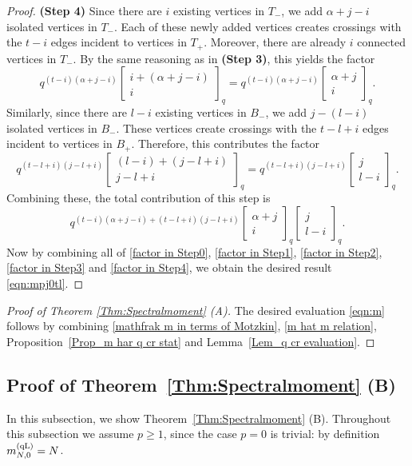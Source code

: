 \documentclass{amsart}
\newcommand{\qbinom}[2]{{\begin{bmatrix}#1\\#2\end{bmatrix}}_q}
\theoremstyle{plain}
\theoremstyle{remark}
\numberwithin{equation}{section}
\begin{document}
\begin{proof}
\noindent \textbf{(Step 4)}  
Since there are $i$ existing vertices in $T_-$, we add $\alpha+j-i$ isolated vertices in $T_-$. Each of these newly added vertices creates crossings with the $t-i$ edges incident to vertices in $T_+$.
Moreover, there are already $i$ connected vertices in $T_-$.
By the same reasoning as in \textbf{(Step 3)}, this yields the factor
        \begin{equation*}
            q^{(t-i)(\alpha+j-i)}\qbinom{i+(\alpha+j-i)}{i}=q^{(t-i)(\alpha+j-i)}\qbinom{\alpha+j}{i}.
        \end{equation*}
Similarly, since there are $l-i$ existing vertices in $B_-$, we add $j-(l-i)$ isolated vertices in $B_-$. These vertices create crossings with the $t-l+i$ edges incident to vertices in $B_+$.
Therefore, this contributes the factor
        \begin{equation*}
            q^{(t-l+i)(j-l+i)}\qbinom{(l-i)+(j-l+i)}{j-l+i}=q^{(t-l+i)(j-l+i)}\qbinom{j}{l-i}.
        \end{equation*}   
Combining these, the total contribution of this step is
\begin{equation}  \label{factor in Step4}
q^{(t-i)(\alpha+j-i)+(t-l+i)(j-l+i)}\qbinom{\alpha+j}{i} \qbinom{j}{l-i}. 
\end{equation}
Now by combining all of \eqref{factor in Step0}, \eqref{factor in Step1}, \eqref{factor in Step2}, \eqref{factor in Step3} and \eqref{factor in Step4}, we obtain the desired result \eqref{eqn:mpj0tl}. 
\end{proof}








\begin{proof}[Proof of Theorem \ref{Thm:Spectralmoment} (A)]
The desired evaluation \eqref{eqn:m} follows by combining \eqref{mathfrak m in terms of Motzkin}, \eqref{m hat m relation}, Proposition~\ref{Prop_m har q cr stat} and Lemma~\ref{Lem_q cr evaluation}.  
\end{proof}
 
\subsection{Proof of Theorem~\ref{Thm:Spectralmoment} (B)} \label{Subsection_Them moment B}

In this subsection, we show Theorem~\ref{Thm:Spectralmoment} (B). Throughout this subsection we assume $p \ge 1$, since the case $p=0$ is trivial: by definition $m_{N,0}^{\rm (qL)} = N$.
\end{document}
